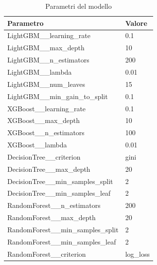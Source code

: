 \begin{table}[H]
    \centering
    \begin{tabular}{|l|l|}
    \toprule
    \textbf{Parametro}                 & \textbf{Valore} \\ \midrule
    LightGBM\_\_learning\_rate            & 0.1             \\ 
    LightGBM\_\_max\_depth                & 10              \\ 
    LightGBM\_\_n\_estimators             & 200             \\ 
    LightGBM\_\_lambda                    & 0.01            \\ 
    LightGBM\_\_num\_leaves               & 15              \\ 
    LightGBM\_\_min\_gain\_to\_split      & 0.1             \\ 
    XGBoost\_\_learning\_rate         & 0.1             \\ 
    XGBoost\_\_max\_depth             & 10              \\ 
    XGBoost\_\_n\_estimators          & 100             \\ 
    XGBoost\_\_lambda                 & 0.01            \\ 
    DecisionTree\_\_criterion         & gini            \\ 
    DecisionTree\_\_max\_depth        & 20              \\ 
    DecisionTree\_\_min\_samples\_split & 2               \\ 
    DecisionTree\_\_min\_samples\_leaf & 2               \\ 
    RandomForest\_\_n\_estimators     & 200             \\ 
    RandomForest\_\_max\_depth        & 20              \\ 
    RandomForest\_\_min\_samples\_split & 2               \\ 
    RandomForest\_\_min\_samples\_leaf & 2               \\ 
    RandomForest\_\_criterion         & log\_loss       \\ \bottomrule
    \end{tabular}
    \caption{Parametri del modello}
    
    \end{table}

